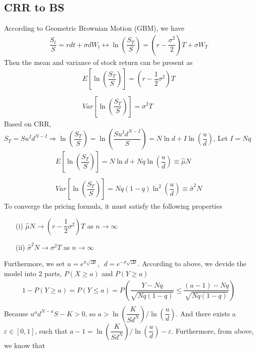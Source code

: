 \documentclass[12pt]{article}
\begin{document}
\subsection*{CRR to BS}
According to Geometric Brownian Motion (GBM), we have\\
\begin{align*}
    \dfrac{S_t}{S} = r dt + \sigma dW_t \leftrightarrow \ln(\dfrac{S_T}{S}) = (r-\dfrac{\sigma^2}{2})T + \sigma W_T
\end{align*}
Then the mean and variance of stock return can be present as
\begin{align*}
    E\left[\ln(\dfrac{S_T}{S})\right] = \left(r-\dfrac{1}{2}\sigma^2\right)T\\\\
    Var\left[\ln(\dfrac{S_T}{S})\right] = \sigma^2 T
\end{align*}
Based on CRR, $S_T = Su^I d^{N-I}\Rightarrow \ln(\dfrac{S_T}{S}) = \ln(\dfrac{Su^I d^{N-I}}{S}) = N\ln d + I\ln(\dfrac{u}{d})$, Let $I = Nq$
\begin{align*}
    E\left[\ln\left(\dfrac{S_T}{S}\right)\right] = N\ln d + Nq\ln(\dfrac{u}{d}) \equiv \hat{\mu}N\\\\
    Var\left[\ln\left(\dfrac{S_T}{S}\right)\right] = Nq(1-q)\ln^2(\dfrac{u}{d}) \equiv \hat{\sigma}^2N
\end{align*}
To converge the pricing formula, it must satisfy the following properties
\begin{enumerate}
    \item[(i)] $\hat{\mu}N \to \left(r-\dfrac{1}{2}\sigma^2\right)T$ as $n\to\infty$\\
    \item[(ii)] $\hat{\sigma}^2N \to \sigma^2 T$ as $n\to\infty$\\
\end{enumerate}
Furthermore, we set $u = e^{\sigma\sqrt{\Delta t}},\ \ d = e^{-\sigma\sqrt{\Delta t}}$. According to above, we devide the model into 2 parts, $P(X\ge a)$ and $P(Y \ge a)$\\
\begin{align*}
    1-P(Y\ge a) = P(Y\leq a) = P(\dfrac{Y-Nq}{\sqrt{Nq(1-q)}}\leq \dfrac{(a-1)-Nq}{\sqrt{Nq(1-q)}})\\
\end{align*}
Because $u^a d^{N-a}S-K> 0$, so $a> \ln(\dfrac{K}{Sd^N})/\ln(\dfrac{u}{d})$. And there exists a $\varepsilon\in [0,1]$, such that $a-1 = \ln(\dfrac{K}{Sd^N})/\ln(\dfrac{u}{d})-\varepsilon$. Furthermore, from above, we know that
\end{document}
